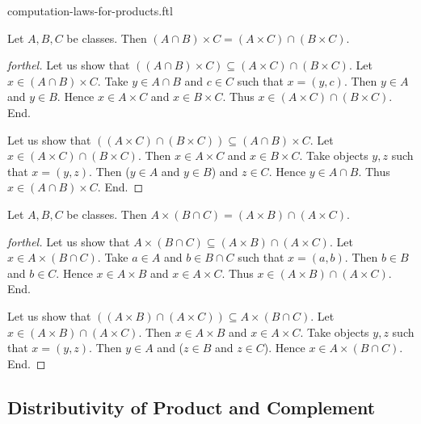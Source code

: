 \documentclass{naproche-library}
\begin{document}
\begin{smodule}{computation-laws-for-products.ftl}
  \begin{proposition}[forthel,id=FOUNDATIONS_05_1249567930580992,printid]
    Let $A, B, C$ be classes.
    Then $(A \cap B) \times C = (A \times C) \cap (B \times C)$.
  \end{proposition}
  \begin{proof}[forthel]
    Let us show that $((A \cap B) \times C) \subseteq (A \times C) \cap (B \times C)$. %
      Let $x \in (A \cap B) \times C$.
      Take $y \in A \cap B$ and $c \in C$ such that $x = (y, c)$.
      Then $y \in A$ and $y \in B$.
      Hence $x \in A \times C$ and $x \in B \times C$.
      Thus $x \in (A \times C) \cap (B \times C)$.
    End.

    Let us show that $((A \times C) \cap (B \times C)) \subseteq (A \cap B) \times C$. %
      Let $x \in (A \times C) \cap (B \times C)$.
      Then $x \in A \times C$ and $x \in B \times C$.
      Take objects $y, z$ such that $x = (y, z)$.
      Then ($y \in A$ and $y \in B$) and $z \in C$.
      Hence $y \in A \cap B$.
      Thus $x \in (A \cap B) \times C$.
    End.
  \end{proof}

  \begin{proposition}[forthel,id=FOUNDATIONS_05_954964241285120,printid]
    Let $A, B, C$ be classes.
    Then $A \times (B \cap C) = (A \times B) \cap (A \times C)$.
  \end{proposition}
  \begin{proof}[forthel]
    Let us show that $A \times (B \cap C) \subseteq (A \times B) \cap (A \times C)$.
      Let $x \in A \times (B \cap C)$.
      Take $a \in A$ and $b \in B \cap C$ such that $x = (a, b)$.
      Then $b \in B$ and $b \in C$.
      Hence $x \in A \times B$ and $x \in A \times C$.
      Thus $x \in (A \times B) \cap (A \times C)$.
    End.

    Let us show that $((A \times B) \cap (A \times C)) \subseteq A \times (B \cap C)$. %
      Let $x \in (A \times B) \cap (A \times C)$.
      Then $x \in A \times B$ and $x \in A \times C$.
      Take objects $y, z$ such that $x = (y, z)$.
      Then $y \in A$ and ($z \in B$ and $z \in C$).
      Hence $x \in A \times (B \cap C)$.
    End.
  \end{proof}


  \subsection*{Distributivity of Product and Complement}


\end{smodule}
\end{document}
